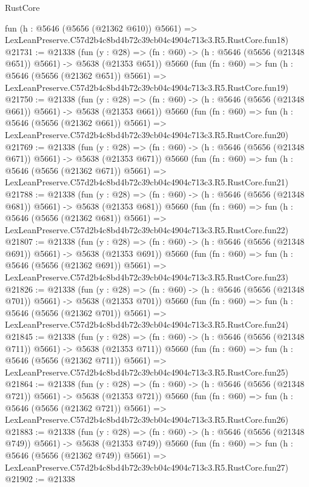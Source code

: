 \begin{lexlean}{RustCore}
\begin{coremodule}
    fun (h : @5646 (@5656 (@21362 @610)) @5661) =>
    LexLeanPreserve.C57d2b4c8bd4b72c39cb04c4904c713c3.R5.RustCore.fun18)
@21731 := @21338
    (fun (y : @28) => (fn : @60) -> (h : @5646 (@5656 (@21348 @651)) @5661) -> @5638 (@21353 @651))
    @5660
    (fun (fn : @60) =>
    fun (h : @5646 (@5656 (@21362 @651)) @5661) =>
    LexLeanPreserve.C57d2b4c8bd4b72c39cb04c4904c713c3.R5.RustCore.fun19)
@21750 := @21338
    (fun (y : @28) => (fn : @60) -> (h : @5646 (@5656 (@21348 @661)) @5661) -> @5638 (@21353 @661))
    @5660
    (fun (fn : @60) =>
    fun (h : @5646 (@5656 (@21362 @661)) @5661) =>
    LexLeanPreserve.C57d2b4c8bd4b72c39cb04c4904c713c3.R5.RustCore.fun20)
@21769 := @21338
    (fun (y : @28) => (fn : @60) -> (h : @5646 (@5656 (@21348 @671)) @5661) -> @5638 (@21353 @671))
    @5660
    (fun (fn : @60) =>
    fun (h : @5646 (@5656 (@21362 @671)) @5661) =>
    LexLeanPreserve.C57d2b4c8bd4b72c39cb04c4904c713c3.R5.RustCore.fun21)
@21788 := @21338
    (fun (y : @28) => (fn : @60) -> (h : @5646 (@5656 (@21348 @681)) @5661) -> @5638 (@21353 @681))
    @5660
    (fun (fn : @60) =>
    fun (h : @5646 (@5656 (@21362 @681)) @5661) =>
    LexLeanPreserve.C57d2b4c8bd4b72c39cb04c4904c713c3.R5.RustCore.fun22)
@21807 := @21338
    (fun (y : @28) => (fn : @60) -> (h : @5646 (@5656 (@21348 @691)) @5661) -> @5638 (@21353 @691))
    @5660
    (fun (fn : @60) =>
    fun (h : @5646 (@5656 (@21362 @691)) @5661) =>
    LexLeanPreserve.C57d2b4c8bd4b72c39cb04c4904c713c3.R5.RustCore.fun23)
@21826 := @21338
    (fun (y : @28) => (fn : @60) -> (h : @5646 (@5656 (@21348 @701)) @5661) -> @5638 (@21353 @701))
    @5660
    (fun (fn : @60) =>
    fun (h : @5646 (@5656 (@21362 @701)) @5661) =>
    LexLeanPreserve.C57d2b4c8bd4b72c39cb04c4904c713c3.R5.RustCore.fun24)
@21845 := @21338
    (fun (y : @28) => (fn : @60) -> (h : @5646 (@5656 (@21348 @711)) @5661) -> @5638 (@21353 @711))
    @5660
    (fun (fn : @60) =>
    fun (h : @5646 (@5656 (@21362 @711)) @5661) =>
    LexLeanPreserve.C57d2b4c8bd4b72c39cb04c4904c713c3.R5.RustCore.fun25)
@21864 := @21338
    (fun (y : @28) => (fn : @60) -> (h : @5646 (@5656 (@21348 @721)) @5661) -> @5638 (@21353 @721))
    @5660
    (fun (fn : @60) =>
    fun (h : @5646 (@5656 (@21362 @721)) @5661) =>
    LexLeanPreserve.C57d2b4c8bd4b72c39cb04c4904c713c3.R5.RustCore.fun26)
@21883 := @21338
    (fun (y : @28) => (fn : @60) -> (h : @5646 (@5656 (@21348 @749)) @5661) -> @5638 (@21353 @749))
    @5660
    (fun (fn : @60) =>
    fun (h : @5646 (@5656 (@21362 @749)) @5661) =>
    LexLeanPreserve.C57d2b4c8bd4b72c39cb04c4904c713c3.R5.RustCore.fun27)
@21902 := @21338

\end{coremodule}
\end{lexlean}

